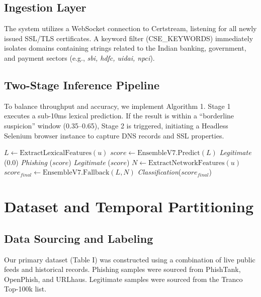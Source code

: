 \documentclass[journal]{IEEEtran}
\begin{document}
\subsection{Ingestion Layer}
The system utilizes a WebSocket connection to Certstream, listening for all newly issued SSL/TLS certificates. A keyword filter (CSE\_KEYWORDS) immediately isolates domains containing strings related to the Indian banking, government, and payment sectors (e.g., \textit{sbi, hdfc, uidai, npci}).

\subsection{Two-Stage Inference Pipeline}
To balance throughput and accuracy, we implement Algorithm 1. Stage 1 executes a sub-10ms lexical prediction. If the result is within a ``borderline suspicion'' window (0.35--0.65), Stage 2 is triggered, initiating a Headless Selenium browser instance to capture DNS records and SSL properties.

\begin{algorithm}
\caption{Two-Stage Inference Pipeline}
\begin{algorithmic}[1]
    \State $L \gets \text{ExtractLexicalFeatures}(u)$
    \State $score \gets \text{EnsembleV7.Predict}(L)$
        \Return \textit{Legitimate} (0.0)
    \EndIf
        \Return \textit{Phishing} ($score$)
        \Return \textit{Legitimate} ($score$)
    \Else {}
        \State $N \gets \text{ExtractNetworkFeatures}(u)$
        \State $score_{final} \gets \text{EnsembleV7.Fallback}(L, N)$
        \Return \textit{Classification}($score_{final}$)
    \EndIf
\EndProcedure
\end{algorithmic}
\end{algorithm}

\section{Dataset and Temporal Partitioning}
\subsection{Data Sourcing and Labeling}
Our primary dataset (Table I) was constructed using a combination of live public feeds and historical records. Phishing samples were sourced from PhishTank, OpenPhish, and URLhaus. Legitimate samples were sourced from the Tranco Top-100k list.
\end{document}

